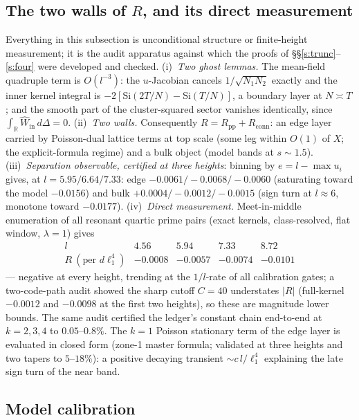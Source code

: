 \documentclass[11pt]{article}
\numberwithin{equation}{section}
\theoremstyle{definition}
\theoremstyle{remark}
\newcommand{\Si}{\mathrm{Si}}
\begin{document}
\subsection{The two walls of $R$, and its direct
measurement}\label{s:cert:walls}

Everything in this subsection is unconditional structure or
finite-height measurement; it is the audit apparatus against
which the proofs of \S\S\ref{s:trunc}--\ref{s:four} were
developed and checked. (i)~\emph{Two ghost lemmas.} The
mean-field quadruple term is $O(l^{-3})$: the $u$-Jacobian
cancels $1/\sqrt{N_1N_2}$ exactly and the inner kernel integral
is $-2[\Si(2T/N)-\Si(T/N)]$, a boundary layer at $N\asymp T$; and
the smooth part of the cluster-squared sector vanishes
identically, since $\int_{\mathbb R}\widehat W_{\mathrm{in}}\,
d\Delta=0$. (ii)~\emph{Two walls.} Consequently
$R=R_{\mathrm{pp}}+R_{\mathrm{conn}}$: an edge layer carried by
Poisson-dual lattice terms at top scale (some leg within $O(1)$
of $X$; the explicit-formula regime) and a bulk object (model
bands at $s\sim1.5$). (iii)~\emph{Separation observable,
certified at three heights}: binning by $e=l-\max u_i$ gives, at
$l=5.95/6.64/7.33$: edge $-0.0061/-0.0068/-0.0060$ (saturating
toward the model $-0.0156$) and bulk $+0.0004/-0.0012/-0.0015$
(sign turn at $l\approx6$, monotone toward $-0.0177$).
(iv)~\emph{Direct measurement.} Meet-in-middle enumeration of all
resonant quartic prime pairs (exact kernels, class-resolved, flat
window, $\lambda=1$) gives
\[
\begin{array}{lcccc}
l & 4.56 & 5.94 & 7.33 & 8.72\\
R\ (\text{per }d\ell_1^4) & -0.0008 & -0.0057 & -0.0074 & -0.0101
\end{array}
\]
--- negative at every height, trending at the $1/l$-rate of all
calibration gates; a two-code-path audit showed the sharp cutoff
$C=40$ understates $|R|$ (full-kernel $-0.0012$ and $-0.0098$ at
the first two heights), so these are magnitude lower bounds. The
same audit certified the ledger's constant chain end-to-end at
$k=2,3,4$ to $0.05$--$0.8\%$. The $k{=}1$ Poisson stationary term
of the edge layer is evaluated in closed form (zone-1 master
formula; validated at three heights and two tapers to
$5$--$18\%$): a positive decaying transient $\sim c\,l/\ell_1^4$
explaining the late sign turn of the near band.

\subsection{Model calibration}\label{s:cert:model}
\end{document}
